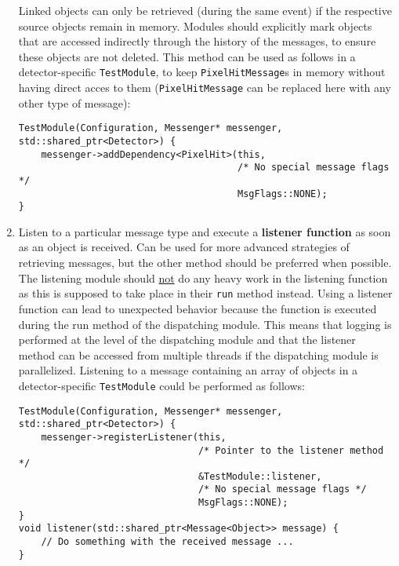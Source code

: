 \begin{enumerate}
Linked objects can only be retrieved (during the same event) if the respective source objects remain in memory.
Modules should explicitly mark objects that are accessed indirectly through the history of the messages, to ensure these objects are not deleted.
This method can be used as follows in a detector-specific \texttt{TestModule}, to keep \texttt{PixelHitMessage}s in memory without having direct acces to them (\texttt{PixelHitMessage} can be replaced here with any other type of message):
\begin{verbatim}
TestModule(Configuration, Messenger* messenger, std::shared_ptr<Detector>) {
    messenger->addDependency<PixelHit>(this,
                                       /* No special message flags */
                                       MsgFlags::NONE);
}
\end{verbatim}
\item Listen to a particular message type and execute a \textbf{listener function} as soon as an object is received.
Can be used for more advanced strategies of retrieving messages, but the other method should be preferred when possible.
The listening module should \underline{not} do any heavy work in the listening function as this is supposed to take place in their \texttt{run} method instead.
Using a listener function can lead to unexpected behavior because the function is executed during the run method of the dispatching module.
This means that logging is performed at the level of the dispatching module and that the listener method can be accessed from multiple threads if the dispatching module is parallelized.
Listening to a message containing an array of objects in a detector-specific \texttt{TestModule} could be performed as follows:
\begin{verbatim}
TestModule(Configuration, Messenger* messenger, std::shared_ptr<Detector>) {
    messenger->registerListener(this,
                                /* Pointer to the listener method */
                                &TestModule::listener,
                                /* No special message flags */
                                MsgFlags::NONE);
}
void listener(std::shared_ptr<Message<Object>> message) {
    // Do something with the received message ...
}
\end{verbatim}
\end{enumerate}

